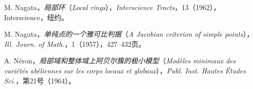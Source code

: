 \begin{description}[style=nextline,leftmargin=2.8em,labelwidth=2.4em]
\item[{[30]}] M. Nagata，\textit{局部环}（\textit{Local rings}），\textit{Interscience Tracts}，13（1962），Interscience，纽约。
\item[{[31]}] M. Nagata，\textit{单纯点的一个雅可比判据}（\textit{A Jacobian criterion of simple points}），\textit{Ill. Journ. of Math.}，1（1957），427--432页。
\item[{[32]}] A. Néron，\textit{局部域和整体域上阿贝尔簇的极小模型}（\textit{Modèles minimaux des variétés abéliennes sur les corps locaux et globaux}），\textit{Publ. Inst. Hautes Études Sci.}，第21号（1964）。
\end{description}
